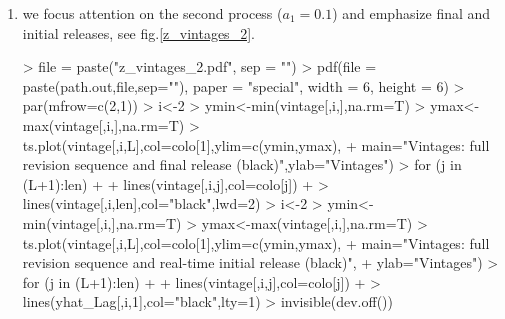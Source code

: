 \documentclass[a4paper]{book}
\begin{document}
\begin{enumerate}
\item we focus attention on the second process ($a_1=0.1$) and emphasize final and initial releases, see fig.\ref{z_vintages_2}. 
\begin{Schunk}
\begin{Sinput}
> file = paste("z_vintages_2.pdf", sep = "")
> pdf(file = paste(path.out,file,sep=""), paper = "special", width = 6, height = 6)
> par(mfrow=c(2,1))
> i<-2
> ymin<-min(vintage[,i,],na.rm=T)
> ymax<-max(vintage[,i,],na.rm=T)
> ts.plot(vintage[,i,L],col=colo[1],ylim=c(ymin,ymax),
+ main="Vintages: full revision sequence and final release (black)",ylab="Vintages")
> for (j in (L+1):len)
+ {
+   lines(vintage[,i,j],col=colo[j])
+ }
> lines(vintage[,i,len],col="black",lwd=2)
> i<-2
> ymin<-min(vintage[,i,],na.rm=T)
> ymax<-max(vintage[,i,],na.rm=T)
> ts.plot(vintage[,i,L],col=colo[1],ylim=c(ymin,ymax),
+ main="Vintages: full revision sequence and real-time initial release (black)",
+ ylab="Vintages")
> for (j in (L+1):len)
+ {
+   lines(vintage[,i,j],col=colo[j])
+ }
> lines(yhat_Lag[,i,1],col="black",lty=1)
> invisible(dev.off())
\end{Sinput}
\end{Schunk}

\end{enumerate}
\end{document}
